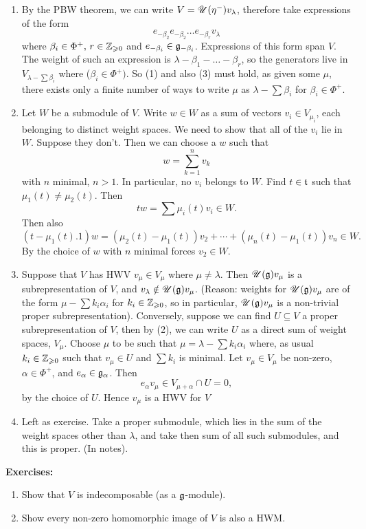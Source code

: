 \documentclass{article}
\begin{document}
\begin{enumerate}
    \item By the PBW theorem, we can write $V = \mathscr{U}(\eta^{-})v_{\lambda}$, therefore take expressions of the form  \[e_{-\beta_{2}} e_{-\beta_{2}} \dots e_{-\beta_{r}} v_{\lambda}\] where $\beta_{i} \in \Phi^{+}, \, r \in \mathbb{Z}_{\geqslant 0}$ and $e_{-\beta_{i}} \in \mathfrak{g}_{-\beta_{i}}$. Expressions of this form span $V$. The weight of such an expression is $\lambda - \beta_{1} - \dots - \beta_{r}$, so the generators live in $V_{\lambda-\sum \beta_{i}}$ where ($\beta_{i} \in \Phi^{+})$. So (1) and also (3) must hold, as given some $\mu$, there exists only a finite number of ways to write $\mu$ as $\lambda - \sum \beta_{i}$ for $\beta_{i} \in \Phi^{+}$.
    \item Let $W$ be a submodule of $V$. Write $w \in W$ as a sum of vectors $v_{i} \in V_{\mu_{i}}$, each belonging to distinct weight spaces. We need to show that all of the $v_{i}$ lie in $W$. Suppose they don't. Then we can choose a $w$ such that \[ w = \sum_{k=1}^{n}v_{k} \] with $n$ minimal, $n>1$. In particular, no $v_{i}$ belongs to $W$. Find $t \in \mathfrak{t}$ such that $\mu_{1}(t) \neq \mu_{2}(t)$. Then  \[ tw = \sum \mu_{i}(t)v_{i} \in W.\] Then also \[(t-\mu_{1}(t).1)w = (\mu_{2}(t)-\mu_{1}(t))v_{2} + \cdots + (\mu_{n}(t)-\mu_{1}(t))v_{n} \in W.\] By the choice of $w$ with $n$ minimal forces $v_{2} \in W$.
    \item[4.] Suppose that $V$ has HWV $v_{\mu} \in V_{\mu}$ where $\mu \neq \lambda$. Then $\mathscr{U}(\mathfrak{g})v_{\mu}$ is a subrepresentation of $V$, and $v_{\lambda} \notin \mathscr{U}(\mathfrak{g})v_{\mu}$. (Reason: weights for $\mathscr{U}(\mathfrak{g})v_{\mu}$ are of the form $\mu- \sum k_{i}\alpha_{i}$ for $k_{i} \in \mathbb{Z}_{\geqslant 0}$, so in particular, $\mathscr{U}(\mathfrak{g})v_{\mu}$ is a non-trivial proper subrepresentation). \gap 
    Conversely, suppose we can find $U \subseteq V$ a proper subrepresentation of $V$, then by (2), we can write $U$ as a direct sum of weight spaces, $V_{\mu}$. Choose $\mu$ to be such that $\mu = \lambda - \sum k_{i} \alpha_{i}$ where, as usual $k_{i} \in \mathbb{Z}_{\geqslant 0}$ such that $v_{\mu} \in U$ and $\sum k_{i}$ is minimal. Let $v_{\mu} \in V_{\mu}$ be non-zero, $\alpha \in \Phi^{+}$, and $e_{\alpha} \in \mathfrak{g}_{\alpha}$. Then \[ e_{\alpha}v_{\mu} \in V_{\mu + \alpha} \cap U = 0,\] by the choice of $U$. Hence $v_{\mu}$ is a HWV for $V$
    \item[5.] Left as exercise. Take a proper submodule, which lies in the sum of the weight spaces other than $\lambda$, and take then sum of all such submodules, and this is proper. (In notes).
\end{enumerate}
\endproof
\textbf{Exercises: }\begin{enumerate}
    \item Show that $V$ is indecomposable (as a $\mathfrak{g}$-module).
    \item Show every non-zero homomorphic image of $V$ is also a HWM.
\end{enumerate}
\end{document}
